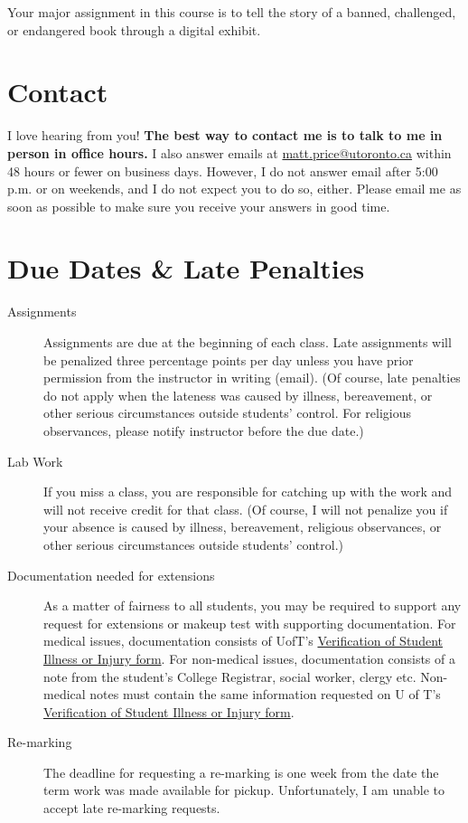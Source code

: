 \documentclass[11pt]{article}
\begin{document}
Your major assignment in this course is to tell the story of a banned, challenged, or endangered book through a digital exhibit.

\section*{Contact}
\label{sec:orgd3c30c4}
I love hearing from you! \textbf{The best way to contact me is to talk to me in person in office hours.} I also answer emails at \href{mailto:matt.price@utoronto.ca}{matt.price@utoronto.ca} within 48 hours or fewer on business days. However, I do not answer email after 5:00 p.m. or on weekends, and I do not expect you to do so, either. Please email me as soon as possible to make sure you receive your answers in good time.

\section*{Due Dates \& Late Penalties}
\label{sec:org57079a9}
\begin{description}
\item[{Assignments}] Assignments are due at the beginning of each class. Late assignments will be penalized three percentage points per day unless you have prior permission from the instructor in writing (email). (Of course, late penalties do not apply when the lateness was caused by illness, bereavement, or other serious circumstances outside students' control. For religious observances, please notify instructor before the due date.)

\item[{Lab Work}] If you miss a class, you are responsible for catching up with the work and will not receive credit for that class. (Of course, I will not penalize you if your absence is caused by illness, bereavement, religious observances, or other serious circumstances outside students' control.)

\item[{Documentation needed for extensions}] As a matter of fairness to all students, you may be required to support any request for extensions or makeup test with supporting documentation. For medical issues, documentation consists of UofT's \href{http://www.illnessverification.utoronto.ca/getattachment/index/Verification-of-Illness-or-Injury-form-Jan-22-2013.pdf.aspx}{Verification of Student Illness or Injury form}. For non-medical issues, documentation consists of a note from the student's College Registrar, social worker, clergy etc. Non-medical notes must contain the same information requested on U of T's \href{http://www.illnessverification.utoronto.ca/getattachment/index/Verification-of-Illness-or-Injury-form-Jan-22-2013.pdf.aspx}{Verification of Student Illness or Injury form}.

\item[{Re-marking}] The deadline for requesting a re-marking is one week from the date the term work was made available for pickup. Unfortunately, I am unable to accept late re-marking requests.
\end{description}
\end{document}
